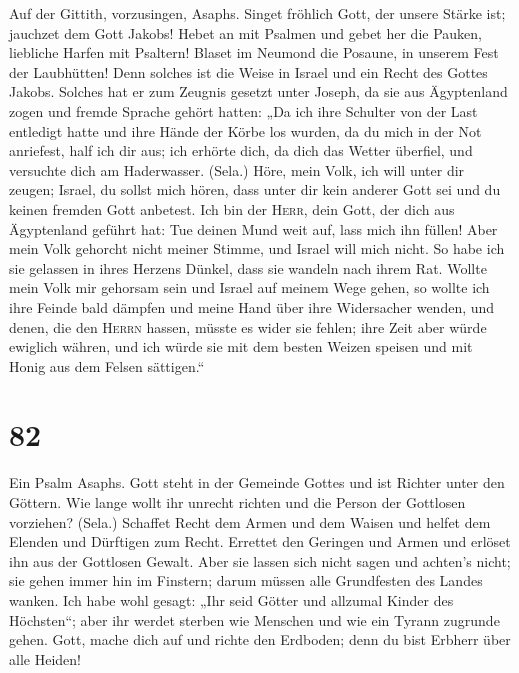  Auf der Gittith, vorzusingen, Asaphs. 
Singet fröhlich Gott, der unsere Stärke ist; jauchzet dem Gott Jakobs!
 Hebet an mit Psalmen und gebet her die Pauken, liebliche
Harfen mit Psaltern!  Blaset im Neumond die Posaune, in
unserem Fest der Laubhütten!  Denn solches ist die Weise
in Israel und ein Recht des Gottes Jakobs.  Solches hat er
zum Zeugnis gesetzt unter Joseph, da sie aus Ägyptenland zogen und
fremde Sprache gehört hatten:  „Da ich ihre Schulter von
der Last entledigt hatte und ihre Hände der Körbe los wurden,
 da du mich in der Not anriefest, half ich dir aus; ich
erhörte dich, da dich das Wetter überfiel, und versuchte dich am
Haderwasser. (Sela.)  Höre, mein Volk, ich will unter dir
zeugen; Israel, du sollst mich hören,  dass unter dir
kein anderer Gott sei und du keinen fremden Gott anbetest.
 Ich bin der \textsc{Herr}, dein Gott, der dich aus
Ägyptenland geführt hat: Tue deinen Mund weit auf, lass mich ihn füllen!
 Aber mein Volk gehorcht nicht meiner Stimme, und Israel
will mich nicht.  So habe ich sie gelassen in ihres
Herzens Dünkel, dass sie wandeln nach ihrem Rat.  Wollte
mein Volk mir gehorsam sein und Israel auf meinem Wege gehen,
 so wollte ich ihre Feinde bald dämpfen und meine Hand
über ihre Widersacher wenden,  und denen, die den
\textsc{Herrn} hassen, müsste es wider sie fehlen; ihre Zeit aber würde
ewiglich währen,  und ich würde sie mit dem besten Weizen
speisen und mit Honig aus dem Felsen sättigen.``

\hypertarget{section-81}{%
\section{82}\label{section-81}}

 Ein Psalm Asaphs. Gott steht in der Gemeinde Gottes und
ist Richter unter den Göttern.  Wie lange wollt ihr
unrecht richten und die Person der Gottlosen vorziehen? (Sela.)
 Schaffet Recht dem Armen und dem Waisen und helfet dem
Elenden und Dürftigen zum Recht.  Errettet den Geringen
und Armen und erlöset ihn aus der Gottlosen Gewalt.  Aber
sie lassen sich nicht sagen und achten's nicht; sie gehen immer hin im
Finstern; darum müssen alle Grundfesten des Landes wanken.
 Ich habe wohl gesagt: „Ihr seid Götter und allzumal
Kinder des Höchsten``;  aber ihr werdet sterben wie
Menschen und wie ein Tyrann zugrunde gehen.  Gott, mache
dich auf und richte den Erdboden; denn du bist Erbherr über alle Heiden!

